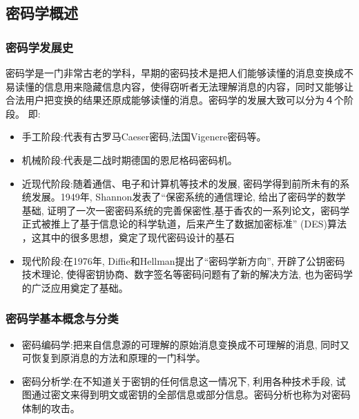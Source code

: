 \documentclass{article}
\begin{document}
\subsection{密码学概述}
\subsubsection{密码学发展史}
密码学是一门非常古老的学科，早期的密码技术是把人们能够读懂的消息变换成不易读懂的信息用来隐藏信息内容，使得窃听者无法理解消息的内容，同时又能够让合法用户把变换的结果还原成能够读懂的消息。密码学的发展大致可以分为４个阶段。\citep{zhaodong}
即:\par
\begin{itemize}
    \item 手工阶段:代表有古罗马Caeser密码,法国Vigenere密码等。
    \item 机械阶段:代表是二战时期德国的恩尼格码密码机。
    \item 近现代阶段:随着通信、电子和计算机等技术的发展, 密码学得到前所未有的系统发展。1949年, Shannon发表了“保密系统的通信理论, 给出了密码学的数学基础, 证明了一次一密密码系统的完善保密性,基于香农的一系列论文，密码学正式被推上了基于信息论的科学轨道，后来产生了数据加密标准” (DES)算法 ，这其中的很多思想，奠定了现代密码设计的基石
    \item 现代阶段:在1976年, Diffie和Hellman提出了“密码学新方向”, 开辟了公钥密码技术理论, 使得密钥协商、数字签名等密码问题有了新的解决方法, 也为密码学的广泛应用奠定了基础。
\end{itemize}
\subsubsection{密码学基本概念与分类}
\begin{itemize}
    \item 密码编码学:把来自信息源的可理解的原始消息变换成不可理解的消息, 同时又可恢复到原消息的方法和原理的一门科学。
    \item 密码分析学:在不知道关于密钥的任何信息这一情况下, 利用各种技术手段, 试图通过密文来得到明文或密钥的全部信息或部分信息。密码分析也称为对密码体制的攻击。
\end{itemize}
\end{document}
